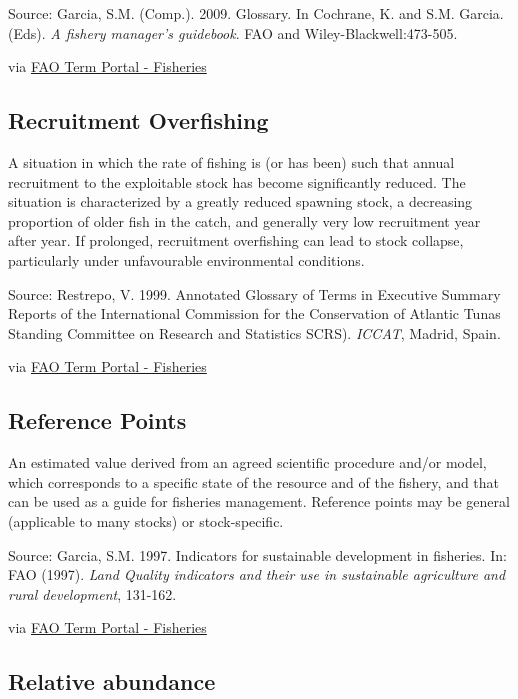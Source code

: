 \documentclass[
  11pt,
]{book}
\begin{document}
Source: Garcia, S.M. (Comp.). 2009. Glossary. In Cochrane, K. and S.M. Garcia. (Eds). \emph{A fishery manager's guidebook}. FAO and Wiley-Blackwell:473-505.

via \href{http://www.fao.org/fishery/glossary/en}{FAO Term Portal - Fisheries}

\hypertarget{recruitment-overfishing}{%
\subsection{Recruitment Overfishing}\label{recruitment-overfishing}}

A situation in which the rate of fishing is (or has been) such that annual recruitment to the exploitable stock has become significantly reduced. The situation is characterized by a greatly reduced spawning stock, a decreasing proportion of older fish in the catch, and generally very low recruitment year after year. If prolonged, recruitment overfishing can lead to stock collapse, particularly under unfavourable environmental conditions.

Source: Restrepo, V. 1999. Annotated Glossary of Terms in Executive Summary Reports of the International Commission for the Conservation of Atlantic Tunas Standing Committee on Research and Statistics SCRS). \emph{ICCAT}, Madrid, Spain.

via \href{http://www.fao.org/fishery/glossary/en}{FAO Term Portal - Fisheries}

\hypertarget{reference-points}{%
\subsection{Reference Points}\label{reference-points}}

An estimated value derived from an agreed scientific procedure and/or model, which corresponds to a specific state of the resource and of the fishery, and that can be used as a guide for fisheries management. Reference points may be general (applicable to many stocks) or stock-specific.

Source: Garcia, S.M. 1997. Indicators for sustainable development in fisheries. In: FAO (1997). \emph{Land Quality indicators and their use in sustainable agriculture and rural development}, 131-162.

via \href{http://www.fao.org/fishery/glossary/en}{FAO Term Portal - Fisheries}

\hypertarget{relative-abundance}{%
\subsection{Relative abundance}\label{relative-abundance}}
\end{document}
